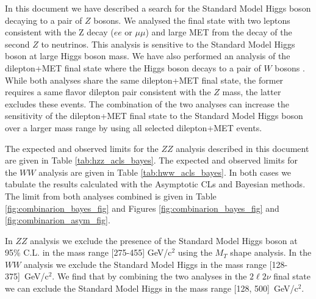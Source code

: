 
In this document we have described a search for the Standard Model Higgs boson
decaying to a pair of $Z$ bosons.  We analysed the final state with two leptons consistent with
the Z decay ($ee$ or $\mu\mu$) and large MET from the decay of the second $Z$ to neutrinos.
This analysis is sensitive to the Standard Model Higgs boson at large Higgs boson mass.
We have also performed an analysis of the dilepton+MET final state where
the Higgs boson decays to a pair of $W$ bosons \cite{HWW2011ANFULL}.
While both analyses share the same dilepton+MET final state, the former 
requires a same flavor dilepton pair consistent with the $Z$ mass,
the latter excludes these events. 
The combination of the two analyses can increase the sensitivity                   
of the dilepton+MET final state to the Standard Model Higgs boson
over a larger mass range by using all selected dilepton+MET events.

The expected and observed limits for the $ZZ$ analysis described in this document
are given in Table \ref{tab:hzz_acls_bayes}.  The expected and observed limits for the
$WW$ analysis are given in Table \ref{tab:hww_acls_bayes}.  In both cases we 
tabulate the results calculated with the Asymptotic CLs and Bayesian methods.
The limit from both analyses combined is given in Table \ref{fig:combinarion_bayes_fig}
and Figures \ref{fig:combinarion_bayes_fig} and \ref{fig:combinarion_asym_fig}.

In $ZZ$ analysis we exclude
the presence of the Standard Model Higgs boson at 95\% C.L. in the mass range
[275-455] GeV/c$^{2}$ using the $M_T$ shape analysis.
In the $WW$ analysis we exclude the Standard Model Higgs in the mass range [128-375]~GeV/c$^{2}$.
We find that by combining the two analyses in the $2\ell2\nu$ final state we
can exclude the Standard Model Higgs in the mass range [128, 500]~GeV/c$^{2}$.

\vspace{20pt}

%
%
%

